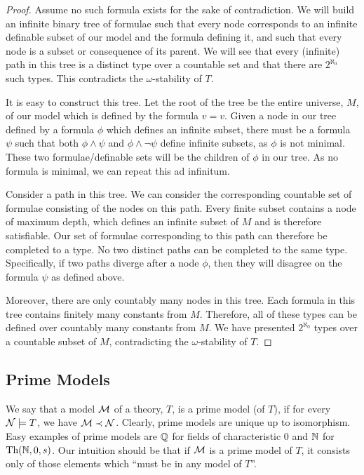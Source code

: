 \begin{proof}
Assume no such formula exists for the sake of contradiction. 
We will build an infinite binary tree of formulae such that 
every node corresponds to an infinite definable subset of our model and the formula defining it, 
and such that every node is a subset or consequence of its parent. 
We will see that every (infinite) path in this tree is a distinct type over a countable set and that there are \(2^{\aleph_0}\) such types. 
This contradicts the \(\omega\)-stability of \(T\).

It is easy to construct this tree. Let the root of the tree be the entire universe, \(M\), of our model which is defined by the formula \(v = v\).
Given a node in our tree defined by a formula \(\phi\) which defines an infinite subset, there must be a formula \(\psi\) such that both \(\phi \land \psi\) and \(\phi \land \neg \psi\) define infinite subsets, as \(\phi\) is not minimal. 
These two formulae/definable sets will be the children of \(\phi\) in our tree. 
As no formula is minimal, we can repeat this ad infinitum. 

Consider a path in this tree. We can consider the corresponding countable set of formulae consisting of the nodes on this path. 
Every finite subset contains a node of maximum depth, which defines an infinite subset of \(M\) and is therefore satisfiable. 
Our set of formulae corresponding to this path can therefore be completed to a type.
No two distinct paths can be completed to the same type. 
Specifically, if two paths diverge after a node \(\phi\), then they will disagree on the formula \(\psi\) as defined above. 

Moreover, there are only countably many nodes in this tree. 
Each formula in this tree contains finitely many constants from \(M\).
Therefore, all of these types can be defined over countably many constants from \(M\). 
We have presented \(2^{\aleph_0}\) types over a countable subset of \(M\), contradicting the \(\omega\)-stability of \(T\).
\end{proof}

\subsection{Prime Models}

\begin{definition}\label{definition_prime_model}
We say that a model \(\mathcal{M}\) of a theory, \(T\), is a prime model (of \(T\)), if for every \(\mathcal{N} \models T\), we have \(\mathcal{M} \prec \mathcal{N}\). 
Clearly, prime models are unique up to isomorphism. 
Easy examples of prime models are \(\mathbb{Q}\) for fields of characteristic 0 and \(\mathbb{N}\) for \(\text{Th}(\mathbb{N}, 0, s)\). 
Our intuition should be that if \(\mathcal{M}\) is a prime model of \(T\), it consists only of those elements which ``must be in any model of \(T\)''.
\end{definition}

